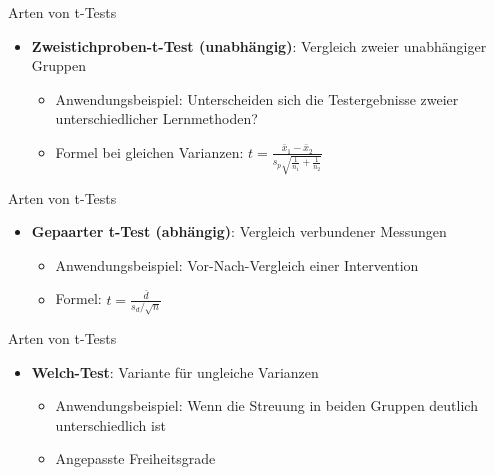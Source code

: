 \documentclass[
  ignorenonframetext,
]{beamer}
\providecommand{\tightlist}{%
  \setlength{\itemsep}{0pt}\setlength{\parskip}{0pt}}
\begin{document}
\begin{frame}{Arten von t-Tests}
\protect{}\label{arten-von-t-tests-1}
\begin{itemize}
\tightlist
\item
  \textbf{Zweistichproben-t-Test (unabhängig)}: Vergleich zweier
  unabhängiger Gruppen

  \begin{itemize}
  \tightlist
  \item
    Anwendungsbeispiel: Unterscheiden sich die Testergebnisse zweier
    unterschiedlicher Lernmethoden?
  \item
    Formel bei gleichen Varianzen:
    \(t = \frac{\bar{x}_1 - \bar{x}_2}{s_p \sqrt{\frac{1}{n_1} + \frac{1}{n_2}}}\)
  \end{itemize}
\end{itemize}
\end{frame}

\begin{frame}{Arten von t-Tests}
\protect{}\label{arten-von-t-tests-2}
\begin{itemize}
\tightlist
\item
  \textbf{Gepaarter t-Test (abhängig)}: Vergleich verbundener Messungen

  \begin{itemize}
  \tightlist
  \item
    Anwendungsbeispiel: Vor-Nach-Vergleich einer Intervention
  \item
    Formel: \(t = \frac{\bar{d}}{s_d / \sqrt{n}}\)
  \end{itemize}
\end{itemize}
\end{frame}

\begin{frame}{Arten von t-Tests}
\protect{}\label{arten-von-t-tests-3}
\begin{itemize}
\tightlist
\item
  \textbf{Welch-Test}: Variante für ungleiche Varianzen

  \begin{itemize}
  \tightlist
  \item
    Anwendungsbeispiel: Wenn die Streuung in beiden Gruppen deutlich
    unterschiedlich ist
  \item
    Angepasste Freiheitsgrade
  \end{itemize}
\end{itemize}
\end{frame}
\end{document}
